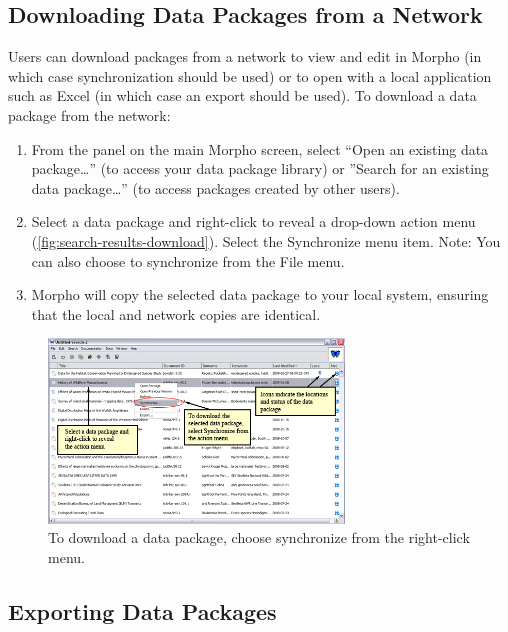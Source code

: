 \subsection{Downloading Data Packages from a Network}

Users can download packages from a network to view and edit in Morpho
(in which case synchronization should be used) or to open with a local
application such as Excel (in which case an export should be used). To
download a data package from the network:
\begin{enumerate}
  \item From the  panel on the main Morpho
    screen, select ``Open an existing data package\ldots'' (to access
    your data package library) or ''Search for an existing data
    package\ldots'' (to access packages created by other users). 
  \item Select a data package and right-click to reveal a drop-down
    action menu (\autoref{fig:search-results-download}). Select the
    Synchronize menu item. Note: You can also choose to synchronize from
    the File menu.
  \item Morpho will copy the selected data package to your local system,
    ensuring that the local and network copies are identical.
\end{enumerate}

\begin{figure}
  \centering
    \includegraphics[width=0.7\textwidth]{images/search-results-download.jpg}
  \caption{To download a data package, choose synchronize from the
    right-click menu.}
  \label{fig:search-results-download}
\end{figure}

\subsection{Exporting Data Packages } \label{sec:exporting-data-packages}

